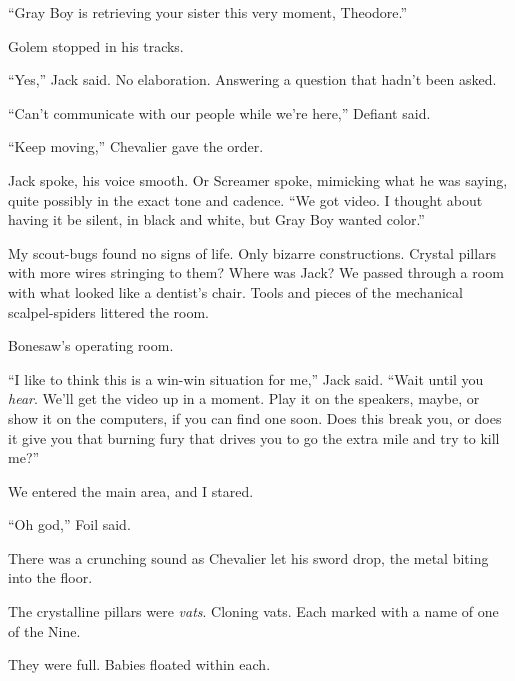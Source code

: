 ``Gray Boy is retrieving your sister this very moment, Theodore.''



Golem stopped in his tracks.



``Yes,'' Jack said.  No elaboration.  Answering a question that hadn't been asked.



``Can't communicate with our people while we're here,'' Defiant said.



``Keep moving,'' Chevalier gave the order.



Jack spoke, his voice smooth.  Or Screamer spoke, mimicking what he was saying, quite possibly in the exact tone and cadence.  ``We got video.  I thought about having it be silent, in black and white, but Gray Boy wanted color.''



My scout-bugs found no signs of life.  Only bizarre constructions.  Crystal pillars with more wires stringing to them?  Where was Jack?  We passed through a room with what looked like a dentist's chair.  Tools and pieces of the mechanical scalpel-spiders littered the room.



Bonesaw's operating room.



``I like to think this is a win-win situation for me,'' Jack said.  ``Wait until you \emph{hear}.  We'll get the video up in a moment.  Play it on the speakers, maybe, or show it on the computers, if you can find one soon.  Does this break you, or does it give you that burning fury that drives you to go the extra mile and try to kill me?''



We entered the main area, and I stared.



``Oh god,'' Foil said.



There was a crunching sound as Chevalier let his sword drop, the metal biting into the floor.



The crystalline pillars were \emph{vats}.  Cloning vats.  Each marked with a name of one of the Nine.



They were full.  Babies floated within each.



